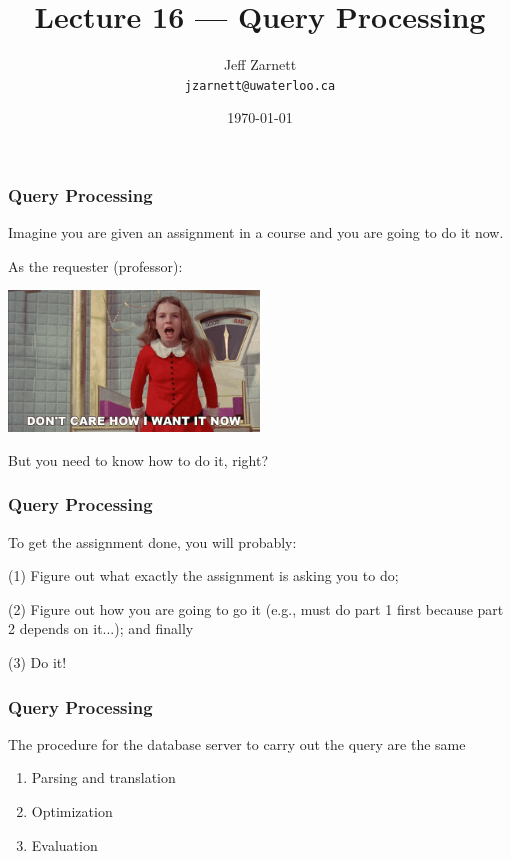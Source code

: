 

\title{Lecture 16 --- Query Processing }

\author{Jeff Zarnett \\ \small \texttt{jzarnett@uwaterloo.ca}}
\date{\today}




\begin{frame}
  \titlepage

 \end{frame}

\begin{frame}
\frametitle{Query Processing}

Imagine you are given an assignment in a course and you are going to do it now. 

As the requester (professor):\\
\begin{center}
	\includegraphics[width=0.5\textwidth]{images/dontcarehow.jpg}
\end{center}

But you need to know how to do it, right?

\end{frame}

\begin{frame}
\frametitle{Query Processing}

To get the assignment done, you will probably: 

(1) Figure out what exactly the assignment is asking you to do; 

(2) Figure out how you are going to go it (e.g., must do part 1 first because part 2 depends on it...); and finally 

(3) Do it! 

\end{frame}


\begin{frame}
\frametitle{Query Processing}

The procedure for the database server to carry out the query are the same

\begin{enumerate}
	\item Parsing and translation
	\item Optimization
	\item Evaluation
\end{enumerate}

\end{frame}

